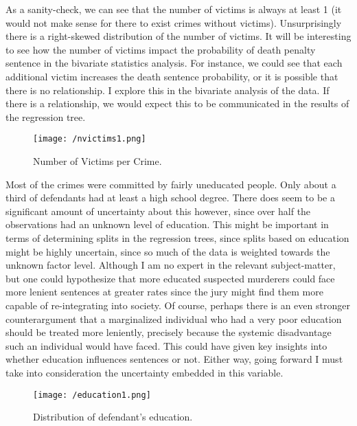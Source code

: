 \documentclass{article}
\begin{document}
As a sanity-check, we can see that the number of victims is always at least 1 (it would not make sense for there to exist crimes without victims). Unsurprisingly there is a right-skewed distribution of the number of victims. It will be interesting to see how the number of victims impact the probability of death penalty sentence in the bivariate statistics analysis. For instance, we could see that each additional victim increases the death sentence probability, or it is possible that there is no relationship. I explore this in the bivariate analysis of the data. If there is a relationship, we would expect this to be communicated in the results of the regression tree. 

\begin{figure}[!htb]
    \centering
    \texttt{[image: /nvictims1.png]}
    \caption{Number of Victims per Crime.}
    \label{nv1}
\end{figure}

\newpage

Most of the crimes were committed by fairly uneducated people. Only about a third of defendants had at least a high school degree. There does seem to be a significant amount of uncertainty about this however, since over half the observations had an unknown level of education. This might be important in terms of determining splits in the regression trees, since splits based on education might be highly uncertain, since so much of the data is weighted towards the unknown factor level. Although I am no expert in the relevant subject-matter, but one could hypothesize that more educated suspected murderers could face more lenient sentences at greater rates since the jury might find them more capable of re-integrating into society. Of course, perhaps there is an even stronger counterargument that a marginalized individual who had a very poor education should be treated more leniently, precisely because the systemic disadvantage such an individual would have faced. This could have given key insights into whether education influences sentences or not. Either way, going forward I must take into consideration the uncertainty embedded in this variable. 

\begin{figure}[!htb]
    \centering
    \texttt{[image: /education1.png]}
    \caption{Distribution of defendant's education.}
    \label{ed1}
\end{figure}
\end{document}
